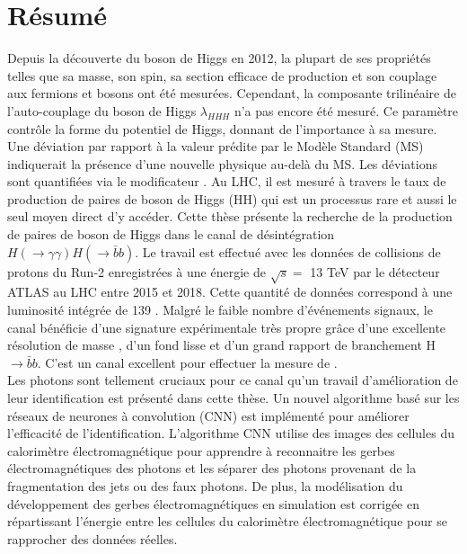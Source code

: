 \chapter*{Résumé}
Depuis la découverte du boson de Higgs en 2012, la plupart de ses propriétés telles que sa masse, son spin, sa section efficace de production et son couplage aux fermions et bosons ont été mesurées. Cependant, la composante trilinéaire de l'auto-couplage du boson de Higgs $\lambda_{HHH}$ n'a pas encore été mesuré. Ce paramètre contrôle la forme du potentiel de Higgs, donnant de l'importance à sa mesure. Une déviation par rapport à la valeur prédite par le Modèle Standard (MS) indiquerait la présence d'une nouvelle physique au-delà du MS. Les déviations sont quantifiées via le modificateur \kl. Au LHC, il est mesuré à travers le taux de production de paires de boson de Higgs (HH) qui est un processus rare et aussi le seul moyen direct d'y accéder. Cette thèse présente la recherche de la production de paires de boson de Higgs dans le canal de désintégration $H(\to\gamma\gamma)H(\to\bar{b}b)$. 
Le travail est effectué avec les données de collisions de protons du Run-2 enregistrées à une énergie de $\sqrt{s} = $ 13 TeV par le détecteur ATLAS au LHC entre 2015 et 2018. Cette quantité de données correspond à une luminosité intégrée de 139 \ifb. Malgré le faible nombre d'événements signaux, le canal \bbyy bénéficie d'une signature expérimentale très propre grâce d'une excellente résolution de masse \myy, d'un fond lisse et d'un grand rapport de branchement H$\to\bar{b}b$. C'est un canal excellent pour effectuer la mesure de \kl. \\
Les photons sont tellement cruciaux pour ce canal qu'un travail d'amélioration de leur identification est présenté dans cette thèse. Un nouvel algorithme basé sur les réseaux de neurones à convolution (CNN) est implémenté pour améliorer l'efficacité de l'identification. L'algorithme CNN utilise des images des cellules du calorimètre électromagnétique pour apprendre à reconnaitre les gerbes électromagnétiques des photons et les séparer des photons provenant de la fragmentation des jets ou des faux photons. De plus, la modélisation du développement des gerbes électromagnétiques en simulation est corrigée en répartissant l'énergie entre les cellules du calorimètre électromagnétique pour se rapprocher des données réelles. \\

